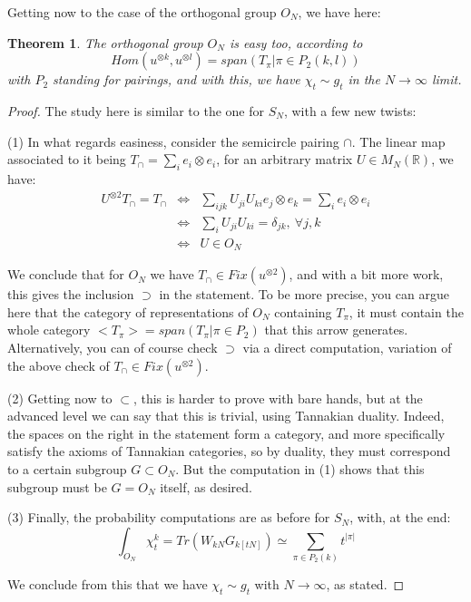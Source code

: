 \documentclass[12pt]{amsbook}
\newtheorem{theorem}{Theorem}[chapter]
\begin{document}
Getting now to the case of the orthogonal group $O_N$, we have here:

\begin{theorem}
The orthogonal group $O_N$ is easy too, according to
$$Hom(u^{\otimes k},u^{\otimes l})=span\left(T_\pi\Big|\pi\in P_2(k,l)\right)$$
with $P_2$ standing for pairings, and with this, we have $\chi_t\sim g_t$ in the $N\to\infty$ limit.
\end{theorem}

\begin{proof}
The study here is similar to the one for $S_N$, with a few new twists:

\medskip

(1) In what regards easiness, consider the semicircle pairing $\cap$. The linear map associated to it being $T_\cap=\sum_ie_i\otimes e_i$, for an arbitrary matrix $U\in M_N(\mathbb R)$, we have: 
\begin{eqnarray*}
U^{\otimes 2}T_\cap=T_\cap
&\iff&\sum_{ijk}U_{ji}U_{ki}e_j\otimes e_k=\sum_ie_i\otimes e_i\\
&\iff&\sum_iU_{ji}U_{ki}=\delta_{jk},\ \forall j,k\\
&\iff&U\in O_N
\end{eqnarray*}

We conclude that for $O_N$ we have $T_\cap\in Fix(u^{\otimes 2})$, and with a bit more work, this gives the inclusion $\supset$ in the statement. To be more precise, you can argue here that the category of representations of $O_N$ containing $T_\pi$, it must contain the whole category $<T_\pi>=span(T_\pi|\pi\in P_2)$ that this arrow generates. Alternatively, you can of course check $\supset$ via a direct computation, variation of the above check of $T_\cap\in Fix(u^{\otimes 2})$.

\medskip

(2) Getting now to $\subset$, this is harder to prove with bare hands, but at the advanced level we can say that this is trivial, using Tannakian duality. Indeed, the spaces on the right in the statement form a category, and more specifically satisfy the axioms of Tannakian categories, so by duality, they must correspond to a certain subgroup $G\subset O_N$. But the computation in (1) shows that this subgroup must be $G=O_N$ itself, as desired.

\medskip

(3) Finally, the probability computations are as before for $S_N$, with, at the end:
$$\int_{O_N}\chi_t^k=Tr(W_{kN}G_{k[tN]})\simeq\sum_{\pi\in P_2(k)}t^{|\pi|}$$

We conclude from this that we have $\chi_t\sim g_t$ with $N\to\infty$, as stated.
\end{proof}
\end{document}

